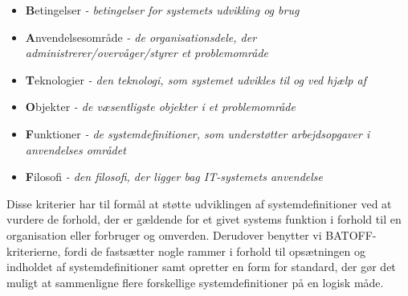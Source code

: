 \begin{itemize}[noitemsep]
\item \textbf{B}etingelser \textit{- betingelser for systemets udvikling og brug}
\item \textbf{A}nvendelsesområde \textit{- de organisationsdele, der administrerer/overvåger/styrer et problemområde}
\item \textbf{T}eknologier \textit{- den teknologi, som systemet udvikles til og ved hjælp af}
\item \textbf{O}bjekter \textit{- de væsentligste objekter i et problemområde}
\item \textbf{F}unktioner \textit{- de systemdefinitioner, som understøtter arbejdsopgaver i anvendelses området}
\item \textbf{F}ilosofi \textit{- den filosofi, der ligger bag IT-systemets anvendelse}
\end{itemize}

Disse kriterier har til formål at støtte udviklingen af systemdefinitioner ved at vurdere de forhold, der er gældende for et givet systems funktion i forhold til en organisation eller forbruger og omverden. Derudover benytter vi BATOFF-kriterierne, fordi de fastsætter nogle rammer i forhold til opsætningen og indholdet af systemdefinitioner samt opretter en form for standard, der gør det muligt at sammenligne flere forskellige systemdefinitioner på en logisk måde.



